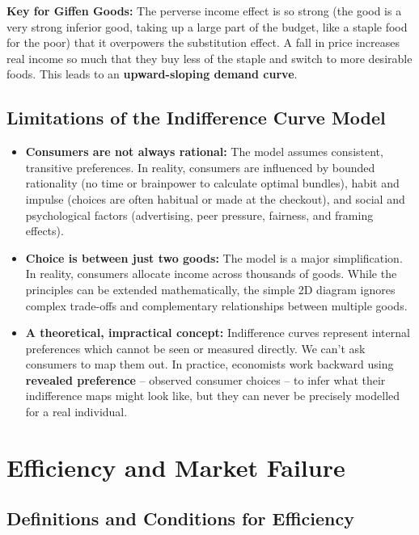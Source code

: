 \documentclass[11pt, a4paper, twoside]{book}
\begin{document}
\begin{coreidea}
\textbf{Key for Giffen Goods:} The perverse income effect is so strong (the good is a very strong inferior good, taking up a large part of the budget, like a staple food for the poor) that it overpowers the substitution effect. A fall in price increases real income so much that they buy less of the staple and switch to more desirable foods. This leads to an \textbf{upward-sloping demand curve}.
\end{coreidea}

\subsection{Limitations of the Indifference Curve Model}

\begin{itemize}
  \item \textbf{Consumers are not always rational:} The model assumes consistent, transitive preferences. In reality, consumers are influenced by bounded rationality (no time or brainpower to calculate optimal bundles), habit and impulse (choices are often habitual or made at the checkout), and social and psychological factors (advertising, peer pressure, fairness, and framing effects).
  \item \textbf{Choice is between just two goods:} The model is a major simplification. In reality, consumers allocate income across thousands of goods. While the principles can be extended mathematically, the simple 2D diagram ignores complex trade-offs and complementary relationships between multiple goods.
  \item \textbf{A theoretical, impractical concept:} Indifference curves represent internal preferences which cannot be seen or measured directly. We can't ask consumers to map them out. In practice, economists work backward using \textbf{revealed preference} -- observed consumer choices -- to infer what their indifference maps might look like, but they can never be precisely modelled for a real individual.
\end{itemize}

\section{Efficiency and Market Failure}

\subsection{Definitions and Conditions for Efficiency}
\end{document}
